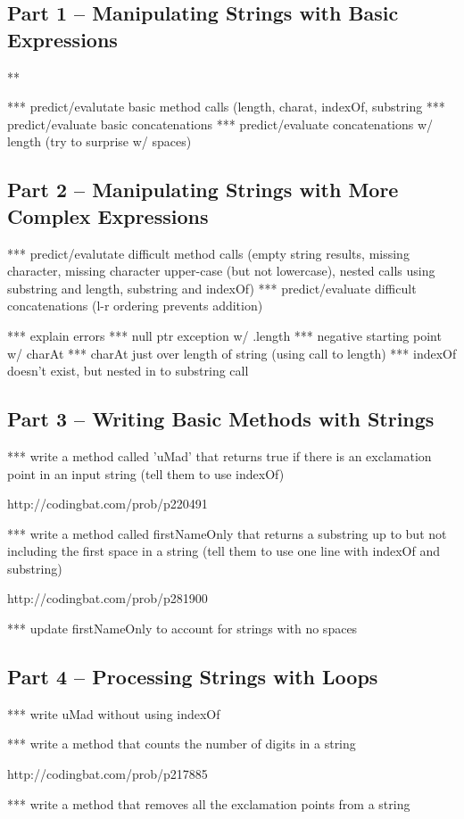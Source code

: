 \subsection{Part 1 -- Manipulating Strings with Basic Expressions}

\begin{eval}
\begin{sevalenum}
\item ***
\evalline
\end{sevalenum}
\end{eval}
*** predict/evalutate basic method calls (length, charat, indexOf, substring
*** predict/evaluate basic concatenations
*** predict/evaluate concatenations w/ length (try to surprise w/ spaces)



\subsection{Part 2 -- Manipulating Strings with More Complex Expressions}
*** predict/evalutate difficult method calls (empty string results, missing character, missing character upper-case (but not lowercase), nested calls using substring and length, substring and indexOf)
*** predict/evaluate difficult concatenations (l-r ordering prevents addition)

*** explain errors
	*** null ptr exception w/ .length
	*** negative starting point w/ charAt
	*** charAt just over length of string (using call to length)
	*** indexOf doesn't exist, but nested in to substring call


\initialbox

\subsection{Part 3 -- Writing Basic Methods with Strings}

*** write a method called 'uMad' that returns true if there is an exclamation point in an input string (tell them to use indexOf)

http://codingbat.com/prob/p220491

*** write a method called firstNameOnly that returns a substring up to but not including the first space in a string (tell them to use one line with indexOf and substring)

http://codingbat.com/prob/p281900

*** update firstNameOnly to account for strings with no spaces

\initialbox


\subsection{Part 4 -- Processing Strings with Loops}

*** write uMad without using indexOf

*** write a method that counts the number of digits in a string

http://codingbat.com/prob/p217885

*** write a method that removes all the exclamation points from a string

\initialbox

